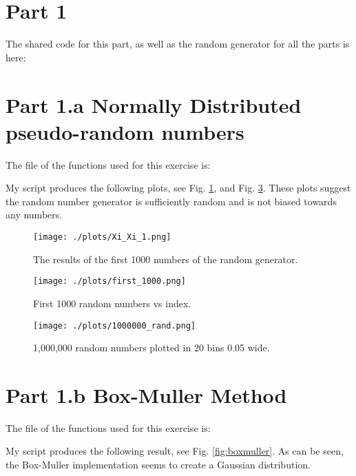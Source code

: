 \section{Part 1}

The shared code for this part, as well as the random generator for all the parts is here:



\section{Part 1.a Normally Distributed pseudo-random numbers}

The file of the functions used for this exercise is:



My script produces the following plots, see Fig. \ref{fig:xi_xi}, and Fig. \ref{fig:million}.
These plots suggest the random number generator is sufficiently random and is not biased towards any numbers.

\begin{figure}[h!]
  \centering
  \texttt{[image: ./plots/Xi\_Xi\_1.png]}
  \caption{The results of the first 1000 numbers of the random generator. }
  \label{fig:xi_xi}
\end{figure}

\begin{figure}[h!]
  \centering
  \texttt{[image: ./plots/first\_1000.png]}
  \caption{First 1000 random numbers vs index.}
  \label{fig:thousand}
\end{figure}

\begin{figure}[h!]
  \centering
  \texttt{[image: ./plots/1000000\_rand.png]}
  \caption{1,000,000 random numbers plotted in 20 bins 0.05 wide.}
  \label{fig:million}
\end{figure}


\section{Part 1.b Box-Muller Method}

The file of the functions used for this exercise is:



My script produces the following result, see Fig. \ref{fig:boxmuller}. As can be seen, the Box-Muller implementation seems
to create a Gaussian distribution.

